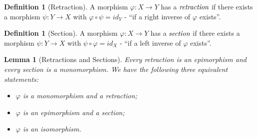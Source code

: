 \documentclass[10pt, oneside, reqno]{amsart}
\theoremstyle{plain}%
\newtheorem{lem}[thm]{Lemma}
\theoremstyle{definition}
\newtheorem{defn}[thm]{Definition}
\theoremstyle{remark}
\newcommand{\Id}{\mathit{id}_}
\begin{document}
\begin{defn}[Retraction]
 A morphism $\varphi: X \to Y$ has a $\emph{retraction}$ if there exists a morphism $\psi: Y \to X$ with $\varphi \circ \psi = \Id{Y}$ - ``if a right inverse of $\varphi$ exists''.
\end{defn}

\begin{defn}[Section]
 A morphism $\varphi: X \to Y$ has a $\emph{section}$ if there exists a morphism $\psi: Y \to X$ with $\psi \circ \varphi = \Id{X}$ - ``if a left inverse of $\varphi$ exists''.
\end{defn}

\begin{lem}[Retractions and Sections]
Every retraction is an epimorphism and every section is a monomorphism.
We have the following three equivalent statements:
\begin{itemize}
\item $\varphi$ is a monomorphism and a retraction;
\item $\varphi$ is an epimorphism and a section;
\item $\varphi$ is an isomorphism.
\end{itemize}
\end{lem}
\end{document}
